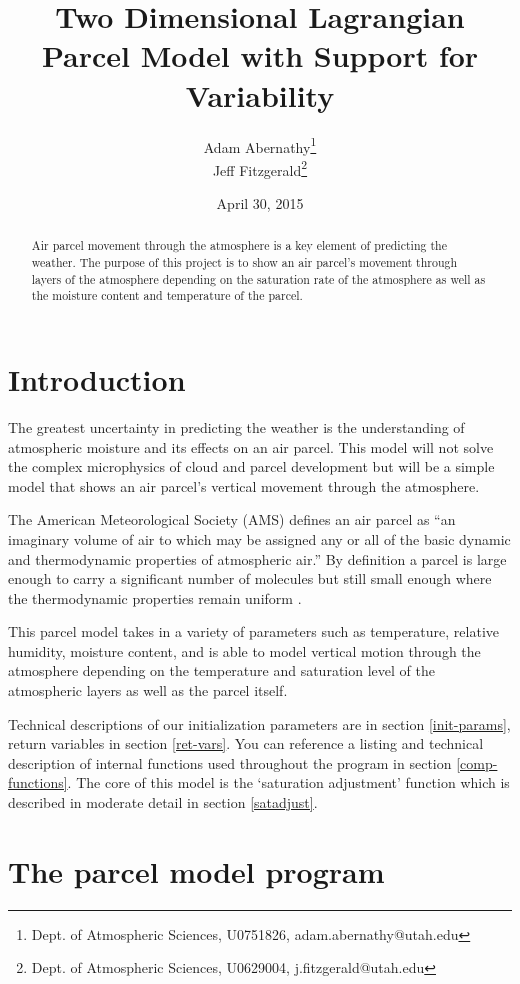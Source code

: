 \documentclass{article}
\title{Two Dimensional Lagrangian Parcel Model with Support for Variability}
\author{Adam Abernathy\footnote{Dept. of Atmospheric Sciences, U0751826, adam.abernathy@utah.edu} \\ Jeff Fitzgerald\footnote{Dept. of Atmospheric Sciences, U0629004, j.fitzgerald@utah.edu}}
\date{April 30, 2015}
\begin{document}
\maketitle

\begin{abstract}
Air parcel movement through the atmosphere is a key element of predicting the weather. The purpose of this project is to show an air parcel's movement through layers of the atmosphere depending on the saturation rate of the atmosphere as well as the moisture content and temperature of the parcel. 
\end{abstract}


\section{Introduction}

The greatest uncertainty in predicting the weather is the understanding of atmospheric moisture and its effects on an air parcel. This model will not solve the complex microphysics of cloud and parcel development but will be a simple model that shows an air parcel's vertical movement through the atmosphere. 

The American Meteorological Society (AMS) defines an air parcel as ``an imaginary volume of air to which may be assigned any or all of the basic dynamic and thermodynamic properties of atmospheric air.'' By definition a parcel is large enough to carry a significant number of molecules but still small enough where the thermodynamic properties remain uniform \cite{ams-gloss-parcel}.

This parcel model takes in a variety of parameters such as temperature, relative humidity, moisture content, and is able to model vertical motion through the atmosphere depending on the temperature and saturation level of the atmospheric layers as well as the parcel itself.

Technical descriptions of our initialization parameters are in section \ref{init-params}, return variables in section \ref{ret-vars}. You can reference a listing and technical description of internal functions used throughout the program in section \ref{comp-functions}. The core of this model is the `saturation adjustment' function which is described in moderate detail in section \ref{satadjust}.


\newpage
\section{The parcel model program}
\end{document}
